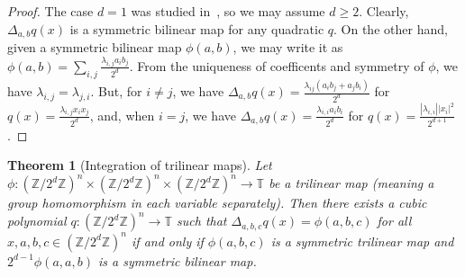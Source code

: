 \documentclass[a4paper,11pt]{article}
\newtheorem{theorem}{Theorem}
\numberwithin{theorem}{section}
\theoremstyle{definition}
\begin{document}
\begin{proof}
    The case $d = 1$ was studied in~\cite{TaoZiegler, Tidor}, so we may assume $d \geq 2$. Clearly, $\Delta_{a,b}q(x)$ is a symmetric bilinear map for any quadratic $q$. On the other hand, given a symmetric bilinear map $\phi(a,b)$, we may write it as $\phi(a,b) = \sum_{i, j} \frac{\lambda_{i,j} a_i b_j}{2^d}$. From the uniqueness of coefficents and symmetry of $\phi$, we have $\lambda_{i,j} = \lambda_{j, i}$. But, for $i \not= j$, we have $\Delta_{a, b} q(x) = \frac{\lambda_{ij}(a_ib_j + a_j b_i)}{2^d}$ for $q(x) = \frac{\lambda_{i,j} x_ix_j}{2^d}$, and, when $i = j$, we have $\Delta_{a, b} q(x) = \frac{\lambda_{i,i}a_ib_i}{2^d}$ for $q(x) = \frac{|\lambda_{i,i}||x_i|^2}{2^{d+1}}$.
\end{proof}

\begin{theorem}[Integration of trilinear maps]\label{trilinearintegration}
    Let $\phi : (\mathbb{Z}/2^d\mathbb{Z})^n \times (\mathbb{Z}/2^d\mathbb{Z})^n \times (\mathbb{Z}/2^d\mathbb{Z})^n \to \mathbb{T}$ be a trilinear map (meaning a group homomorphism in each variable separately). Then there exists a cubic polynomial $q : (\mathbb{Z}/2^d\mathbb{Z})^n \to \mathbb{T}$ such that $\Delta_{a,b,c}q(x) = \phi(a,b,c)$ for all $x,a,b,c \in (\mathbb{Z}/2^d\mathbb{Z})^n$ if and only if $\phi(a,b,c)$ is a symmetric trilinear map and $2^{d-1}\phi(a,a,b)$ is a symmetric bilinear map.
\end{theorem}
\end{document}
